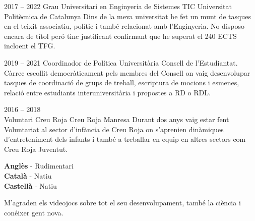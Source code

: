 \documentclass[9pt]{developercv} %
\begin{document}


\begin{entrylist}
	\entry
		{2017 -- 2022}
		{Grau Universitari en Enginyeria de Sistemes TIC}
		{Universitat Politècnica de Catalunya}
		{Dins de la meva universitat he fet un munt de tasques en el teixit associatiu, polític i també
relacionat amb l’Enginyeria. No disposo encara de títol peró tinc justificant confirmant que he superat el 240 ECTS incloent el TFG.}
\end{entrylist}


\begin{entrylist}
	\entry
	{2019 -- 2021}
	{Coordinador de Política Universitària}
	{Consell de l'Estudiantat.}
	{ Càrrec escollit democràticament pels membres del Consell on vaig desenvolupar tasques de
	coordinació de grups de treball, escriptura de mocions i esmenes, relació entre estudiants
	interuniversitària i propostes a RD o RDL.
	\\ }

	\entry
	{2016 -- 2018\\}
	{Voluntari Creu Roja}
	{Creu Roja Manresa}
	{Durant dos anys vaig estar fent Voluntariat al sector d’infància de Creu Roja on s’aprenien
	dinàmiques d’entreteniment dels infants i també a treballar en equip en altres sectors com Creu
	Roja Juventut. \\ }
\end{entrylist}

\begin{minipage}[t]{0.3\textwidth}
	\vspace{-\baselineskip} %

	
	\textbf{Anglès} - Rudimentari\\
	\textbf{Català} - Natiu\\
	\textbf{Castellà} - Natiu
\end{minipage}
\hfill
\begin{minipage}[t]{0.3\textwidth}
	\vspace{-\baselineskip} %
	
	
   M'agraden els videojocs sobre tot el seu desenvolupament, també la ciència i conéixer gent nova.
	
\end{minipage}
\hfill

\end{document}
